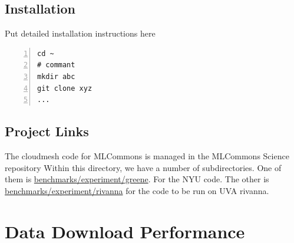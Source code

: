 \documentclass[sigplan,screen]{acmart}
\begin{document}
\subsection{Installation}

Put detailed installation instructions here

{\footnotesize
\begin{Verbatim}[numbers=left,xleftmargin=5mm]
cd ~
# commant
mkdir abc
git clone xyz
...
\end{Verbatim}
}

\subsection{Project Links}


The cloudmesh code for MLCommons is managed in the MLCommons Science repository \cite{github-laszewsk-mlcommons}
Within this directory, we have a number of subdirectories. One of them is \href{https://github.com/laszewsk/mlcommons/tree/main/benchmarks/cloudmask/experiments/rivanna}{benchmarks/experiment/greene}. For the NYU code. The other is \href{https://github.com/laszewsk/mlcommons/tree/main/benchmarks/cloudmask/experiments/rivanna}{benchmarks/experiment/rivanna} for the code to be run on UVA rivanna.

\section{Data Download Performance}
\end{document}
